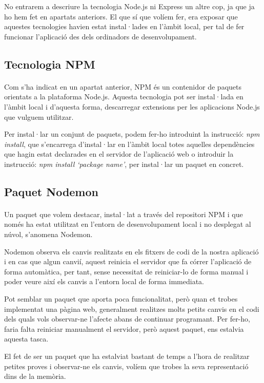     No entrarem a descriure la tecnologia Node.js ni Express un altre cop, ja que ja ho hem fet en apartats anteriors. El que sí que volíem fer, era exposar que aquestes tecnologies havien estat instal·lades en l’àmbit local, per tal de fer funcionar l'aplicació des dels ordinadors de desenvolupament.


    \subsection{Tecnologia NPM}

    \paragraph{}
    Com s'ha indicat en un apartat anterior, NPM és un contenidor de paquets orientats a la plataforma Node.js. Aquesta tecnologia pot ser instal·lada en l'àmbit local i d'aquesta forma, descarregar extensions per les aplicacions Node.js que vulguem utilitzar.

    Per instal·lar un conjunt de paquets, podem fer-ho introduint la instrucció: \emph{npm install}, que s’encarrega d’instal·lar en l’àmbit local totes aquelles dependències que hagin estat declarades en el servidor de l’aplicació web o introduir la instrucció: \emph{npm install `package name’}, per instal·lar un paquet en concret.


    \subsection{Paquet Nodemon}

    \paragraph{}
    Un paquet que volem destacar, instal·lat a través del repositori NPM i que només ha estat utilitzat en l’entorn de desenvolupament local i no desplegat al núvol, s’anomena Nodemon.

    Nodemon observa els canvis realitzats en els fitxers de codi de la nostra aplicació i en cas que algun canvií, aquest reinicia el servidor que fa córrer l'aplicació de forma automàtica, per tant, sense necessitat de reiniciar-lo de forma manual i poder veure així els canvis a l'entorn local de forma immediata.

    Pot semblar un paquet que aporta poca funcionalitat, però quan et trobes implementat una pàgina web, generalment realitzes molts petits canvis en el codi dels quals vols observar-ne l'afecte abans de continuar programant. Per fer-ho, faria falta reiniciar manualment el servidor, però aquest paquet, ens estalvia aquesta tasca.

    El fet de ser un paquet que ha estalviat bastant de temps a l'hora de realitzar petites proves i observar-ne els canvis, volíem que trobes la seva representació dins de la memòria.
